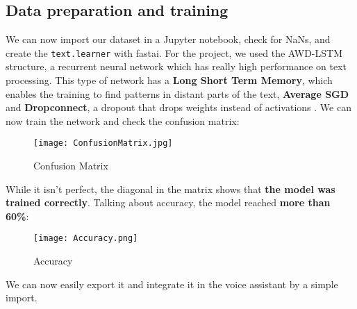 \documentclass[conference]{IEEEtran}
\begin{document}
\subsection{Data preparation and training}
We can now import our dataset in a Jupyter notebook, check for NaNs, and create the \texttt{text.learner} with fastai. For the project, we used the AWD-LSTM structure, a recurrent neural network which has really high performance on text processing. This type of network has a \textbf{Long Short Term Memory}\cite{lstm}, which enables the training to find patterns in distant parts of the text, \textbf{Average SGD} and \textbf{Dropconnect}, a dropout that drops weights instead of activations \cite{awd-lstm}. We can now train the network and check the confusion matrix:
\begin{figure*}[!ht]
    \begin{center}
        \texttt{[image: ConfusionMatrix.jpg]}
    \end{center}
    \caption{Confusion Matrix}
    \label{fig:confusion-matrix}
\end{figure*}
While it isn't perfect, the diagonal in the matrix shows that \textbf{the model was trained correctly}. Talking about accuracy, the model reached \textbf{more than 60\%}:
\begin{figure}[H]
    \begin{center}
        \texttt{[image: Accuracy.png]}
    \end{center}
    \caption{Accuracy}
    \label{fig:accuracy}
\end{figure}
We can now easily export it and integrate it in the voice assistant by a simple import.
\end{document}
